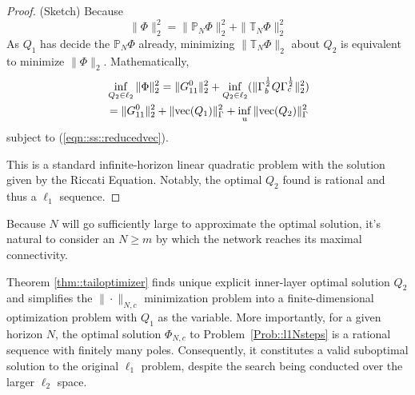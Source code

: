 \begin{proof}(Sketch) 
Because
\begin{equation}
    \|\Phi\|_2^2 = \|\mathbb{P}_{N}\Phi\|_2^2 +\|\mathbb{T}_{N}\Phi\|_2^2
\end{equation}
As \(Q_1\) has decide the \(\mathbb{P}_{N}\Phi\) already, minimizing \(\|\mathbb{T}_{N}\Phi\|_2\) about \(Q_2\) is equivalent to minimize \(\|\Phi\|_2\). Mathematically, 
\begin{equation}
\begin{split}
    &\inf_{Q_2\in \ell_2} \|\Phi\|_2^2 = \|G_{11}^0\|_2^2 + \inf_{Q_2\in \ell_2}(\|\Gamma_b^{\frac{1}{2}} Q \Gamma_c^{\frac{1}{2}}\|_2^2)  \\
    & = \|G_{11}^0\|_2^2 + \|{\mathrm{vec}}(Q_1)\|_\Gamma^2 + \inf_{u} \|{\mathrm{vec}}(Q_2)\|_\Gamma^2
\end{split}
\end{equation}
subject to (\ref{eqn::ss::reducedvec}). 

This is a standard infinite-horizon linear quadratic problem with the solution given by the Riccati Equation. Notably, the optimal \(Q_2\) found is rational and thus a \(\ell_1\) sequence.
\end{proof}

\begin{rem}
Because \(N\) will go sufficiently large to approximate the optimal solution, it's natural to consider an \(N \geq m\) by which the network reaches its maximal connectivity.
\end{rem}

Theorem \ref{thm::tailoptimizer} finds unique explicit inner-layer optimal solution \(Q_2\) and simplifies the \(\|\cdot\|_{N,c}\) minimization problem into a finite-dimensional optimization problem with \(Q_1\) as the variable. 
More importantly, for a given horizon \(N\), the optimal solution \(\Phi_{N,c}\) to Problem~\ref{Prob::l1Nsteps} is a rational sequence with finitely many poles. Consequently, it constitutes a valid suboptimal solution to the original \(\ell_1\) problem, despite the search being conducted over the larger \(\ell_2\) space.

